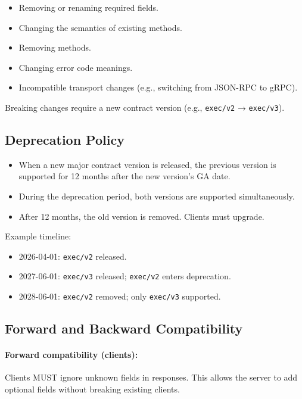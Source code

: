 \begin{itemize}
  \item Removing or renaming required fields.
  \item Changing the semantics of existing methods.
  \item Removing methods.
  \item Changing error code meanings.
  \item Incompatible transport changes (e.g., switching from JSON-RPC to gRPC).
\end{itemize}

Breaking changes require a new contract version (e.g., \texttt{exec/v2} →
\texttt{exec/v3}).

\subsection{Deprecation Policy}

\begin{itemize}
  \item When a new major contract version is released, the previous version is
        supported for 12 months after the new version's GA date.
  \item During the deprecation period, both versions are supported
        simultaneously.
  \item After 12 months, the old version is removed.  Clients must upgrade.
\end{itemize}

Example timeline:

\begin{itemize}
  \item 2026-04-01: \texttt{exec/v2} released.
  \item 2027-06-01: \texttt{exec/v3} released; \texttt{exec/v2} enters
        deprecation.
  \item 2028-06-01: \texttt{exec/v2} removed; only \texttt{exec/v3} supported.
\end{itemize}

\subsection{Forward and Backward Compatibility}

\paragraph{Forward compatibility (clients):}

Clients MUST ignore unknown fields in responses.  This allows the server to add
optional fields without breaking existing clients.

